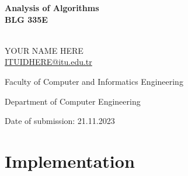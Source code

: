 \documentclass[12pt]{report}
\author{Meral Kuyucu}
\numberwithin{figure}{chapter}
\begin{document}
\begin{titlepage}
\begin{center}
    \vspace*{-3cm}
    
    \vspace{2.3cm}
    

    \vspace{1cm}
    {\textbf{Analysis of Algorithms\\}}
    \vspace{0.3cm}
    {\textbf{BLG 335E\\}}
    \vspace{2.4cm}
    
    {}\\
    YOUR NAME HERE \\ \href{mailto:ITUIDHERE@itu.edu.tr}{ITUIDHERE@itu.edu.tr}\\
    \vspace{0.9cm}

\end{center}
{\raggedleft\vfill{\begin{singlespace}
     Faculty of Computer and Informatics Engineering\\
\end{singlespace}
 Department of Computer Engineering\\
 \begin{singlespace}
 Date of submission: 21.11.2023\\
 
 
 \end{singlespace}
}\par
}
\end{titlepage}

\newpage

\chapter{Implementation}
 
\end{document}
